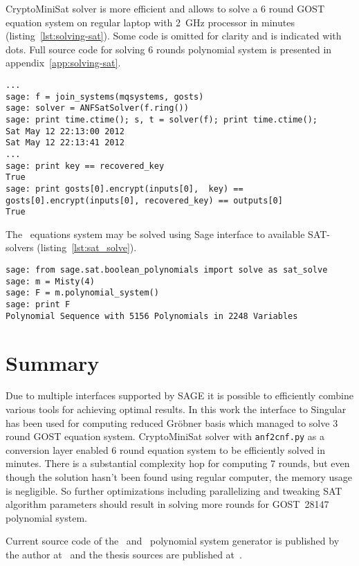 \mbox{CryptoMiniSat} solver is more efficient and allows to solve a 6 round GOST
equation system on regular laptop with 2~GHz processor in minutes
(listing~\ref{lst:solving-sat}). Some code is omitted for clarity and is
indicated with dots. Full source code for solving 6 rounds polynomial system is
presented in appendix~\ref{app:solving-sat}.
\begin{lstlisting}[label=lst:solving-sat, caption=Solving 6 round GOST system using SAT solver]
...
sage: f = join_systems(mqsystems, gosts)
sage: solver = ANFSatSolver(f.ring())
sage: print time.ctime(); s, t = solver(f); print time.ctime();
Sat May 12 22:13:00 2012
Sat May 12 22:13:41 2012
...
sage: print key == recovered_key
True
sage: print gosts[0].encrypt(inputs[0],  key) == gosts[0].encrypt(inputs[0], recovered_key) == outputs[0]
True
\end{lstlisting}

The \misty\ equations system may be solved using Sage interface to available
SAT-solvers (listing~\ref{lst:sat_solve}).
\begin{lstlisting}[label=lst:sat_solve, caption=Using Sage SAT interface]
sage: from sage.sat.boolean_polynomials import solve as sat_solve
sage: m = Misty(4)
sage: F = m.polynomial_system()
sage: print F
Polynomial Sequence with 5156 Polynomials in 2248 Variables
\end{lstlisting}

\section{Summary}

Due to multiple interfaces supported by SAGE it is possible to efficiently
combine various tools for achieving optimal results. In this work the interface
to Singular has been used for computing reduced Gr\"obner basis which managed
to solve 3 round GOST equation system.
\mbox{CryptoMiniSat} solver with \verb+anf2cnf.py+ as a conversion layer
enabled 6 round equation system to be efficiently solved in minutes. There is a
substantial complexity hop for computing 7 rounds, but even though the solution
hasn't been found using regular computer, the memory usage is negligible. So
further optimizations including parallelizing and tweaking SAT algorithm
parameters should result in solving more rounds for GOST~28147 polynomial
system.

Current source code of the \gost\ and \misty\  polynomial system generator is
published by the author at~\cite{zoresvit:repo-algebraic} and the thesis sources
are published at~\cite{zoresvit:thesis}.
